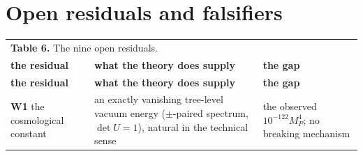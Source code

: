 \documentclass[aps,prd,amsmath,amssymb,superscriptaddress,longbibliography,floatfix,preprint]{revtex4-2}
\begin{document}
\section{Open residuals and falsifiers}

{\scriptsize
\renewcommand{\arraystretch}{1.45}

\begin{longtable}{lll}
\multicolumn{3}{l}{\textbf{Table 6.} The nine open residuals.} \\
\addlinespace[2pt]
\toprule
\parbox[c]{3.6cm}{\vspace{2.5pt}\raggedright {} \textbf{the residual}\vspace{2.5pt}} & \parbox[c]{5.21cm}{\vspace{2.5pt}\raggedright {} \textbf{what the theory does supply}\vspace{2.5pt}} & \parbox[c]{6.29cm}{\vspace{2.5pt}\raggedright {} \textbf{the gap}\vspace{2.5pt}} \\
\midrule
\endfirsthead
\toprule
\parbox[c]{3.6cm}{\vspace{2.5pt}\raggedright {} \textbf{the residual}\vspace{2.5pt}} & \parbox[c]{5.21cm}{\vspace{2.5pt}\raggedright {} \textbf{what the theory does supply}\vspace{2.5pt}} & \parbox[c]{6.29cm}{\vspace{2.5pt}\raggedright {} \textbf{the gap}\vspace{2.5pt}} \\
\midrule
\endhead
\midrule
\endfoot
\bottomrule
\endlastfoot
\parbox[c]{3.6cm}{\vspace{2.5pt}\raggedright {} \textbf{W1} the cosmological constant\vspace{2.5pt}} & \parbox[c]{5.21cm}{\vspace{2.5pt}\raggedright {} an exactly vanishing tree-level vacuum energy (\mbox{$\pm$}-paired spectrum, \mbox{$\det U = 1$}), natural in the technical sense\vspace{2.5pt}} & \parbox[c]{6.29cm}{\vspace{2.5pt}\raggedright {} the observed \mbox{$10^{-122}M_P^4$}; no breaking mechanism\vspace{2.5pt}} \\

\end{longtable}}
\end{document}
